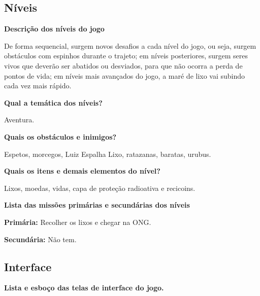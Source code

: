 \documentclass[]{scrartcl}
\begin{document}
\subsection{Níveis}

\noindent\textbf{Descrição dos níveis do jogo}

De forma sequencial, surgem novos desafios a cada nível do jogo, ou seja, surgem obstáculos com espinhos durante o trajeto; em níveis posteriores, surgem seres vivos que deverão ser abatidos ou desviados, para que não ocorra a perda de pontos de vida; em níveis mais avançados do jogo, a maré de lixo vai subindo cada vez mais rápido.

\noindent\textbf{Qual a temática dos níveis?}

Aventura.

\noindent\textbf{Quais os obstáculos e inimigos?}

Espetos, morcegos, Luiz Espalha Lixo, ratazanas, baratas, urubus.

\noindent\textbf{Quais os itens e demais elementos do nível?}

Lixos, moedas, vidas, capa de proteção radioativa e recicoins.

\noindent\textbf{Lista das missões primárias e secundárias dos níveis}

\textbf{Primária:} Recolher os lixos e chegar na ONG.

\textbf{Secundária:} Não tem.

\subsection{Interface}

\noindent\textbf{Lista e esboço das telas de interface do jogo.}
\end{document}
